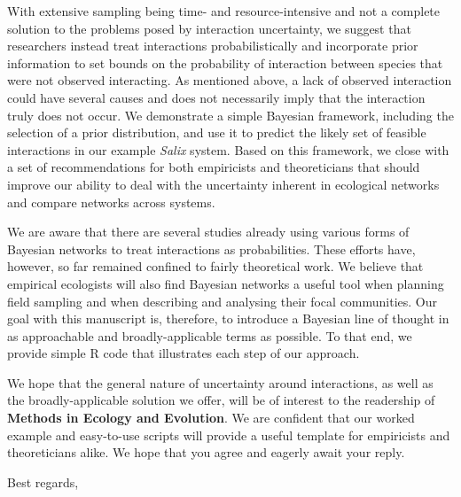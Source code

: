 \documentclass[12pt]{letter}
\begin{document}
\begin{letter}
    With extensive sampling being time- and resource-intensive and not a complete solution to the problems posed by interaction uncertainty, we suggest that researchers instead treat interactions probabilistically and incorporate prior information to set bounds on the probability of interaction between species that were not observed interacting. As mentioned above, a lack of observed interaction could have several causes and does not necessarily imply that the interaction truly does not occur. We demonstrate a simple Bayesian framework, including the selection of a prior distribution, and use it to predict the likely set of feasible interactions in our example \emph{Salix} system. Based on this framework, we close with a set of recommendations for both empiricists and theoreticians that should improve our ability to deal with the uncertainty inherent in ecological networks and compare networks across systems.


    We are aware that there are several studies already using various forms of Bayesian networks to treat interactions as probabilities. These efforts have, however, so far remained confined to fairly theoretical work. We believe that empirical ecologists will also find Bayesian networks a useful tool when planning field sampling and when describing and analysing their focal communities. Our goal with this manuscript is, therefore, to introduce a Bayesian line of thought in as approachable and broadly-applicable terms as possible. To that end, we provide simple R code that illustrates each step of our approach. 


    We hope that the general nature of uncertainty around interactions, as well as the broadly-applicable solution we offer, will be of interest to the readership of \textbf{Methods in Ecology and Evolution}. We are confident that our worked example and easy-to-use scripts will provide a useful template for empiricists and theoreticians alike. We hope that you agree and eagerly await your reply.


\closing{Best regards,}


\end{letter}
\end{document}
